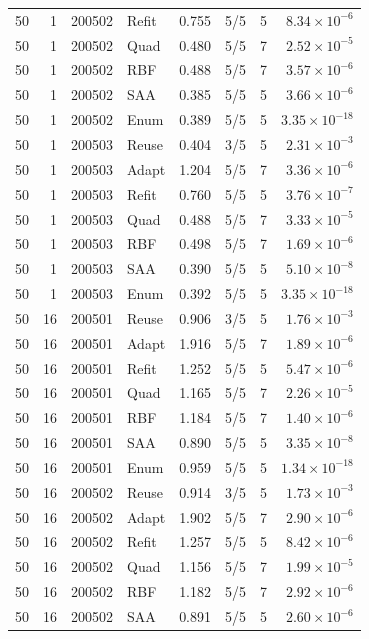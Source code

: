 \begin{longtable}{rrrlrrrr}
50 & 1 & 200502 & Refit & 0.755 & 5/5 & 5 & $8.34\times10^{-6}$\\
50 & 1 & 200502 & Quad & 0.480 & 5/5 & 7 & $2.52\times10^{-5}$\\
50 & 1 & 200502 & RBF & 0.488 & 5/5 & 7 & $3.57\times10^{-6}$\\
50 & 1 & 200502 & SAA & 0.385 & 5/5 & 5 & $3.66\times10^{-6}$\\
50 & 1 & 200502 & Enum & 0.389 & 5/5 & 5 & $3.35\times10^{-18}$\\
50 & 1 & 200503 & Reuse & 0.404 & 3/5 & 5 & $2.31\times10^{-3}$\\
50 & 1 & 200503 & Adapt & 1.204 & 5/5 & 7 & $3.36\times10^{-6}$\\
50 & 1 & 200503 & Refit & 0.760 & 5/5 & 5 & $3.76\times10^{-7}$\\
50 & 1 & 200503 & Quad & 0.488 & 5/5 & 7 & $3.33\times10^{-5}$\\
50 & 1 & 200503 & RBF & 0.498 & 5/5 & 7 & $1.69\times10^{-6}$\\
50 & 1 & 200503 & SAA & 0.390 & 5/5 & 5 & $5.10\times10^{-8}$\\
50 & 1 & 200503 & Enum & 0.392 & 5/5 & 5 & $3.35\times10^{-18}$\\
50 & 16 & 200501 & Reuse & 0.906 & 3/5 & 5 & $1.76\times10^{-3}$\\
50 & 16 & 200501 & Adapt & 1.916 & 5/5 & 7 & $1.89\times10^{-6}$\\
50 & 16 & 200501 & Refit & 1.252 & 5/5 & 5 & $5.47\times10^{-6}$\\
50 & 16 & 200501 & Quad & 1.165 & 5/5 & 7 & $2.26\times10^{-5}$\\
50 & 16 & 200501 & RBF & 1.184 & 5/5 & 7 & $1.40\times10^{-6}$\\
50 & 16 & 200501 & SAA & 0.890 & 5/5 & 5 & $3.35\times10^{-8}$\\
50 & 16 & 200501 & Enum & 0.959 & 5/5 & 5 & $1.34\times10^{-18}$\\
50 & 16 & 200502 & Reuse & 0.914 & 3/5 & 5 & $1.73\times10^{-3}$\\
50 & 16 & 200502 & Adapt & 1.902 & 5/5 & 7 & $2.90\times10^{-6}$\\
50 & 16 & 200502 & Refit & 1.257 & 5/5 & 5 & $8.42\times10^{-6}$\\
50 & 16 & 200502 & Quad & 1.156 & 5/5 & 7 & $1.99\times10^{-5}$\\
50 & 16 & 200502 & RBF & 1.182 & 5/5 & 7 & $2.92\times10^{-6}$\\
50 & 16 & 200502 & SAA & 0.891 & 5/5 & 5 & $2.60\times10^{-6}$\\

\end{longtable}
